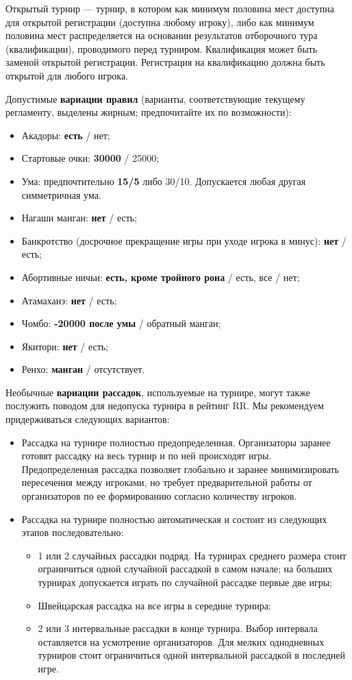 Открытый турнир --- турнир, в котором как минимум половина мест доступна для открытой регистрации (доступна любому игроку), либо как минимум половина мест распределяется на основании результатов отборочного тура (квалификации), проводимого перед турниром. Квалификация может быть заменой открытой регистрации. Регистрация на квалификацию должна быть открытой для любого игрока.

Допустимые \textbf{вариации правил} (варианты, соответствующие текущему регламенту, выделены жирным; предпочитайте их по возможности):
\begin{itemize}
	\item Акадоры: \textbf{есть} / нет;
	\item Стартовые очки: \textbf{30000} / 25000;
	\item Ума: предпочтительно \textbf{15/5} либо 30/10. Допускается любая другая симметричная ума.
	\item Нагаши манган: \textbf{нет} / есть;
	\item Банкротство (досрочное прекращение игры при уходе игрока в минус): \textbf{нет} / есть;
	\item Абортивные ничьи: \textbf{есть, кроме тройного рона} / есть, все / нет;
	\item Атамаханэ: \textbf{нет} / есть;
	\item Чомбо: \textbf{-20000 после умы} / обратный манган;
	\item Якитори: \textbf{нет} / есть;
	\item Ренхо: \textbf{манган} / отсутствует.
\end{itemize}

Необычные \textbf{вариации рассадок}, используемые на турнире, могут также послужить поводом для недопуска турнира в рейтинг RR. Мы рекомендуем придерживаться следующих вариантов:
\begin{itemize}
	\item Рассадка на турнире полностью предопределенная. Организаторы заранее готовят рассадку на весь турнир и по ней происходят игры. Предопределенная рассадка позволяет глобально и заранее минимизировать пересечения между игроками, но требует предварительной работы от организаторов по ее формированию согласно количеству игроков.
	\item Рассадка на турнире полностью автоматическая и состоит из следующих этапов последовательно:
	\begin{itemize}
		\item 1 или 2 случайных рассадки подряд. На турнирах среднего размера стоит ограничиться одной случайной рассадкой в самом начале; на больших турнирах допускается играть по случайной рассадке первые две игры;
		\item Швейцарская рассадка на все игры в середине турнира;
		\item 2 или 3 интервальные рассадки в конце турнира. Выбор интервала оставляется на усмотрение организаторов. Для мелких однодневных турниров стоит ограничиться одной интервальной рассадкой в последней игре.
	\end{itemize}
\end{itemize}

